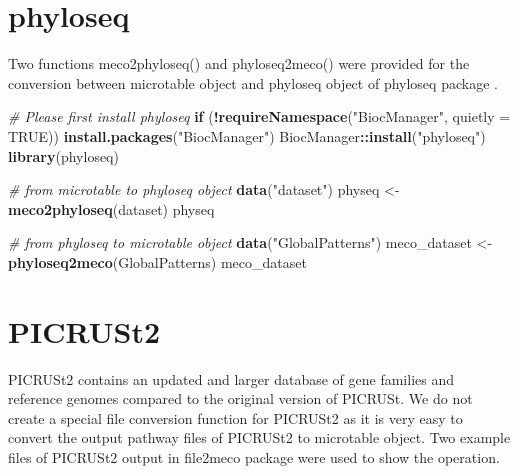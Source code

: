 \documentclass[
]{book}
\newenvironment{Shaded}{\begin{snugshade}}{\end{snugshade}}
\newcommand{\AttributeTok}[1]{\textcolor[rgb]{0.13,0.29,0.53}{#1}}
\newcommand{\CommentTok}[1]{\textcolor[rgb]{0.56,0.35,0.01}{\textit{#1}}}
\newcommand{\ConstantTok}[1]{\textcolor[rgb]{0.56,0.35,0.01}{#1}}
\newcommand{\ControlFlowTok}[1]{\textcolor[rgb]{0.13,0.29,0.53}{\textbf{#1}}}
\newcommand{\FunctionTok}[1]{\textcolor[rgb]{0.13,0.29,0.53}{\textbf{#1}}}
\newcommand{\NormalTok}[1]{#1}
\newcommand{\OtherTok}[1]{\textcolor[rgb]{0.56,0.35,0.01}{#1}}
\newcommand{\SpecialCharTok}[1]{\textcolor[rgb]{0.81,0.36,0.00}{\textbf{#1}}}
\newcommand{\StringTok}[1]{\textcolor[rgb]{0.31,0.60,0.02}{#1}}
\begin{document}
\section{phyloseq}\label{phyloseq}

Two functions meco2phyloseq() and phyloseq2meco() were provided for the conversion between microtable object and phyloseq object of phyloseq package \citep{Mcmurdie_phyloseq_2013}.

\begin{Shaded}
\begin{Highlighting}[]
\CommentTok{\# Please first install phyloseq}
\ControlFlowTok{if}\NormalTok{ (}\SpecialCharTok{!}\FunctionTok{requireNamespace}\NormalTok{(}\StringTok{"BiocManager"}\NormalTok{, }\AttributeTok{quietly =} \ConstantTok{TRUE}\NormalTok{)) }\FunctionTok{install.packages}\NormalTok{(}\StringTok{"BiocManager"}\NormalTok{)}
\NormalTok{BiocManager}\SpecialCharTok{::}\FunctionTok{install}\NormalTok{(}\StringTok{"phyloseq"}\NormalTok{)}
\FunctionTok{library}\NormalTok{(phyloseq)}
\end{Highlighting}
\end{Shaded}

\begin{Shaded}
\begin{Highlighting}[]
\CommentTok{\# from microtable to phyloseq object}
\FunctionTok{data}\NormalTok{(}\StringTok{"dataset"}\NormalTok{)}
\NormalTok{physeq }\OtherTok{\textless{}{-}} \FunctionTok{meco2phyloseq}\NormalTok{(dataset)}
\NormalTok{physeq}
\end{Highlighting}
\end{Shaded}

\begin{Shaded}
\begin{Highlighting}[]
\CommentTok{\# from phyloseq to microtable object}
\FunctionTok{data}\NormalTok{(}\StringTok{"GlobalPatterns"}\NormalTok{)}
\NormalTok{meco\_dataset }\OtherTok{\textless{}{-}} \FunctionTok{phyloseq2meco}\NormalTok{(GlobalPatterns)}
\NormalTok{meco\_dataset}
\end{Highlighting}
\end{Shaded}

\section{PICRUSt2}\label{picrust2}

PICRUSt2 \citep{Douglas_PICRUSt2_2020} contains an updated and larger database of gene families and reference genomes compared to the original version of PICRUSt.
We do not create a special file conversion function for PICRUSt2
as it is very easy to convert the output pathway files of PICRUSt2 to microtable object.
Two example files of PICRUSt2 output in file2meco package were used to show the operation.
\end{document}
